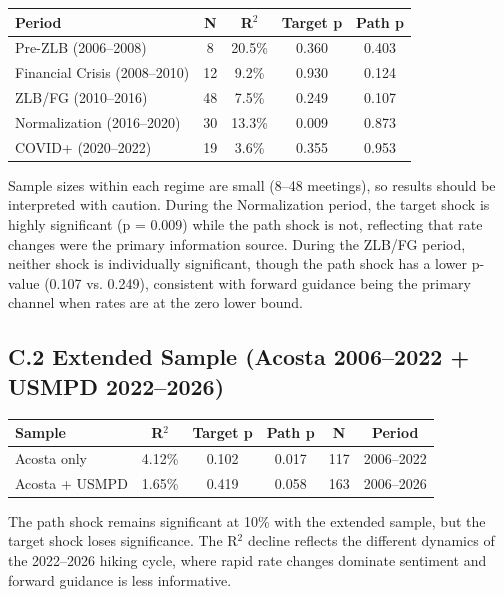 \documentclass[12pt]{article}
\begin{document}
\begin{table}[htbp]\centering
\begin{tabular}{lcccc}\toprule
Period & N & R$^2$ & Target p & Path p \\\midrule
Pre-ZLB (2006--2008) & 8 & 20.5\% & 0.360 & 0.403 \\
Financial Crisis (2008--2010) & 12 & 9.2\% & 0.930 & 0.124 \\
ZLB/FG (2010--2016) & 48 & 7.5\% & 0.249 & 0.107 \\
Normalization (2016--2020) & 30 & 13.3\% & 0.009 & 0.873 \\
COVID+ (2020--2022) & 19 & 3.6\% & 0.355 & 0.953 \\
\bottomrule\end{tabular}
\end{table}

Sample sizes within each regime are small (8--48 meetings), so results should be interpreted with caution. During the Normalization period, the target shock is highly significant (p = 0.009) while the path shock is not, reflecting that rate changes were the primary information source. During the ZLB/FG period, neither shock is individually significant, though the path shock has a lower p-value (0.107 vs. 0.249), consistent with forward guidance being the primary channel when rates are at the zero lower bound.

\subsection{C.2 Extended Sample (Acosta 2006--2022 + USMPD 2022--2026)}

\begin{table}[htbp]\centering
\begin{tabular}{lccccc}\toprule
Sample & R$^2$ & Target p & Path p & N & Period \\\midrule
Acosta only & 4.12\% & 0.102 & 0.017 & 117 & 2006--2022 \\
Acosta + USMPD & 1.65\% & 0.419 & 0.058 & 163 & 2006--2026 \\
\bottomrule\end{tabular}
\end{table}

The path shock remains significant at 10\% with the extended sample, but the target shock loses significance. The R$^2$ decline reflects the different dynamics of the 2022--2026 hiking cycle, where rapid rate changes dominate sentiment and forward guidance is less informative.
\end{document}
